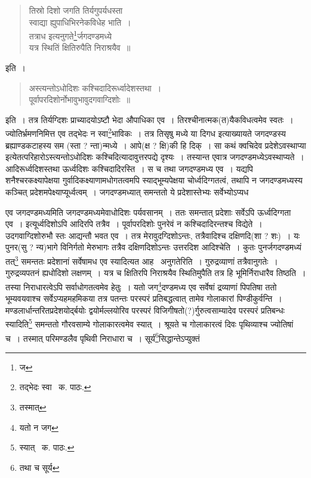 \documentclass[11pt, openany]{book}
\begin{document}
\begin{quote}
{\qt तिस्रो दिशो जगति तिर्यगुपर्यधस्ता\\
	स्वाद्या ह्युपाधिभिरनेकविधेह भाति~।\\
तत्राध इत्यनुगते\renewcommand{\thefootnote}{३}\footnote{ज}र्जगदण्डमध्ये\\
यत्र स्थितिं क्षितिरुपैति निराश्रयैव~॥}
\end{quote}

\noindent इति~।

\begin{quote}
{\qt अस्त्यन्तोऽधोदिशः कश्चिदादिरूर्ध्वादेशस्तथा~।\\
पूर्वापरदिशोर्नोभावुभावुदगवाग्दिशोः~॥}
\end{quote}

\noindent इति~। तत्र तिर्यग्दिशः प्राच्यादयोऽष्टौ भेदा औपाधिका एव~। तिरश्चीनात्मक(त)यैकविधत्वमेव स्वतः~। ज्योतिर्भ्रमणनिमित्त एव तद्भेदः न स्वा\renewcommand{\thefootnote}{४}\footnote{तद्भेदः स्वा \textendash\ क. पाठः.}भाविकः~। तत्र तिसृषु मध्ये या दिगध इत्याख्यायते जगदण्डस्य ब्रह्याण्डकटाहस्य सम (स्ता ? न्ता)न्मध्ये~। आपे(क्ष ? क्षि)की हि दिक्~। सा कथं क्वचिदेव प्रदेशेऽवस्थाप्या इत्येतत्परिहारोऽस्त्यन्तोऽधोदिशः कश्चिदित्यादावुत्तरपद्ये दृश्यः~। तस्यान्त एवात्र जगदण्डमध्येऽवस्थाप्यते~। आदिरूर्ध्वदिशस्तथा ऊर्ध्वदिशः कश्चिदादिरस्ति~। स च तथा जगदण्डमध्य एव~। यद्यपि शनैश्चरकक्ष्यापेक्षया गुर्वादिकक्ष्याणामधोगतत्वमपि स्याद्भूम्यपेक्षया चोर्ध्वदिग्गतत्वं, तथापि न जगदण्डमध्यस्य कञ्चित् प्रदेशमपेक्ष्याप्यूर्ध्वत्वम्~। जगदण्डमध्यात् समन्ततो ये प्रदेशास्तेभ्यः सर्वेभ्योऽप्यध

\newpage

\noindent एव जगदण्डमध्यमिति जगदण्डमध्यमेवाधोदिशः पर्यवसानम्~। ततः समन्तात् प्रदेशाः सर्वेऽपि ऊर्ध्वदिग्गता एव~। इत्यूर्ध्वदिशोऽपि आदिरपि तत्रैव~। पूर्वापरदिशोः पुनरेवं न कश्चिदादिरन्तश्च विद्येते~। उदगवाग्दिशोरुभौ स्तः आद्यन्तौ भवत एव~। तत्र मेरावुदग्दिशोऽन्तः, तत्रैवादिश्च
दक्षिणदि(शा ? शः)~। यः पुनर(सु ? न्य)भागे विनिर्गतो मेरुभागः तत्रैव दक्षिणदिशोऽन्तः उत्तरदिश आदिश्चेति~। कुतः पुनर्जगदण्डमध्यं तत्\renewcommand{\thefootnote}{१}\footnote{तस्मात्} समन्ततः प्रदेशानां सर्वेषामध एव स्यादित्यत आह \textendash\ {\qt अनुगते}रिति~। गुरुद्रव्याणां तत्रैवानुगतेः~। गुरुद्रव्यपतनं ह्यधोदिशो लक्षणम्~। यत्र च क्षितिरपि निराश्रयैव स्थितिमुपैति तत्र हि भूमिर्निराधारैव तिष्ठति~। तस्या निराधारत्वेऽपि सर्वाधोगतत्वमेव हेतुः~। यतो जग\renewcommand{\thefootnote}{२}\footnote{यतो न जग}दण्डमध्य एव सर्वेषां
द्रव्याणां पिपतिषा ततो भूम्यवयवाश्च सर्वेऽप्यहमहमिकया तत्र पतन्तः परस्परं प्रतिबद्धत्वात् तामेव गोलाकारां पिण्डीकुर्वन्ति~।
मण्डलार्धान्तरितप्रदेशयोर्द्बयोः द्वयोर्मल्लयोरिव परस्परं विजिगीषतो(?)र्गुरुत्वसाम्यादेव परस्परं प्रतिबन्धः स्यादिति\renewcommand{\thefootnote}{३}\footnote{स्यात् \textendash\ क. पाठः.} समन्ततो गौरवसाम्ये गोलाकारत्वमेव स्यात्~। श्रूयते च गोलाकारत्वं दिवः पृथिव्याश्च ज्योतिषां च~। तस्मात् परिमण्डलैव पृथिवी निराधारा च~। सूर्य\renewcommand{\thefootnote}{४}\footnote{तथा च सूर्य}सिद्धान्तेऽप्युक्तं\textendash
\end{document}
